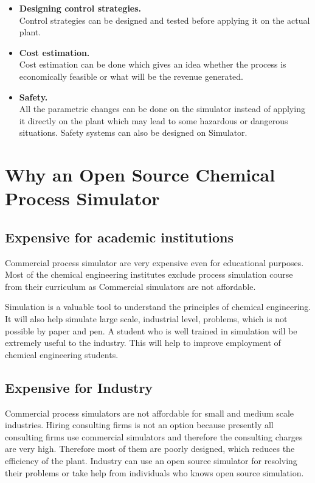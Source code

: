 \documentclass[12pt]{report}
\begin{document}
\begin{itemize}
\item{\textbf{Designing control strategies.}} \\
Control strategies can be designed and tested before applying it on the actual plant.

\item{\textbf{Cost estimation.}} \\
Cost estimation can be done which gives an idea whether the process is economically feasible or what will be the revenue generated.

\item{\textbf{Safety.}} \\
All the parametric changes can be done on the simulator instead of applying it directly on the plant which may lead to some hazardous or dangerous situations. Safety systems can also be designed on Simulator.
\end{itemize}

\section{Why an Open Source Chemical Process Simulator}

\subsection{Expensive for academic institutions}
Commercial process simulator are very expensive even for educational purposes. Most of the chemical engineering institutes exclude process simulation course from their curriculum as Commercial simulators are not affordable.

Simulation is a valuable tool to understand the principles of chemical engineering. It will also help simulate large scale, industrial level, problems, which is not possible by paper and pen. A student who is well trained in simulation will be extremely useful to the industry. This will help to improve employment of chemical engineering students.

\subsection{Expensive for Industry}
Commercial process simulators are not affordable for small and medium scale industries. Hiring consulting firms is not an option because presently all consulting firms use commercial simulators and therefore the consulting charges are very high. Therefore most of them are poorly designed, which reduces the efficiency of the plant. Industry can use an open source simulator for resolving their problems or take help from individuals who knows open source simulation.
\end{document}
